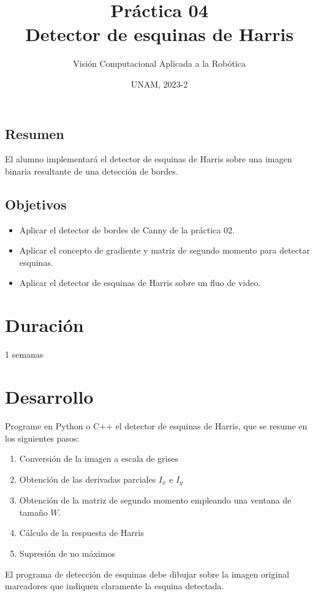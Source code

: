 \documentclass[letterpaper,11pt]{article}
\title{Práctica 04\\Detector de esquinas de Harris}
\author{Visión Computacional Aplicada a la Robótica}
\date{UNAM, 2023-2}
\begin{document}
\renewcommand{\tablename}{Tabla}

\maketitle

\subsection*{Resumen}
El alumno implementará el detector de esquinas de Harris sobre una imagen binaria resultante de una detección de bordes.


\subsection*{Objetivos}
\begin{itemize}
\item Aplicar el detector de bordes de Canny de la práctica 02.
\item Aplicar el concepto de gradiente y matriz de segundo momento para detectar esquinas.
\item Aplicar el detector de esquinas de Harris sobre un fluo de video.  
\end{itemize}

\section*{Duración}
1 semanas

\section*{Desarrollo}
Programe en Python o C++ el detector de esquinas de Harris, que se resume en los siguientes pasos:

\begin{enumerate}
\item Conversión de la imagen a escala de grises
\item Obtención de las derivadas parciales $I_x$ e $I_y$
\item Obtención de la matriz de segundo momento empleando una ventana de tamaño $W$.
\item Cálculo de la respuesta de Harris
\item Supresión de no máximos
\end{enumerate}

El programa de detección de esquinas debe dibujar sobre la imagen original marcadores que indiquen claramente la esquina detectada. 
\end{document}

